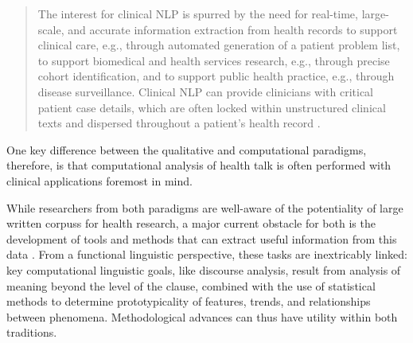 \begin{quote}\singlespacing\small
The interest for clinical NLP is spurred by the need for real\hyp{}time, large\hyp{}scale, and accurate information extraction from health records to support clinical care, e.g., through automated generation of a patient problem list, to support biomedical and health services research, e.g., through precise cohort identification, and to support public health practice, e.g., through disease surveillance. Clinical \gls{NLP} can provide clinicians with critical patient case details, which are often locked within unstructured clinical texts and dispersed throughout a patient's health record \parencite*[p.~183]{velupillai2015recent}.
\end{quote}
%
One key difference between the qualitative and computational paradigms, therefore, is that computational analysis of health talk is often performed with clinical applications foremost in mind.

While researchers from both paradigms are well\hyp{}aware of the potentiality of large written \glspl{corpus} for health research, a major current obstacle for both is the development of tools and methods that can extract useful information from this data \cite{paul_social_2016,anthony_critical_2013}. From a functional linguistic perspective, these tasks are inextricably linked: key computational linguistic goals, like discourse analysis, result from analysis of meaning beyond the level of the clause, combined with the use of statistical methods to determine prototypicality of features, trends, and relationships between phenomena. Methodological advances can thus have utility within both traditions.

